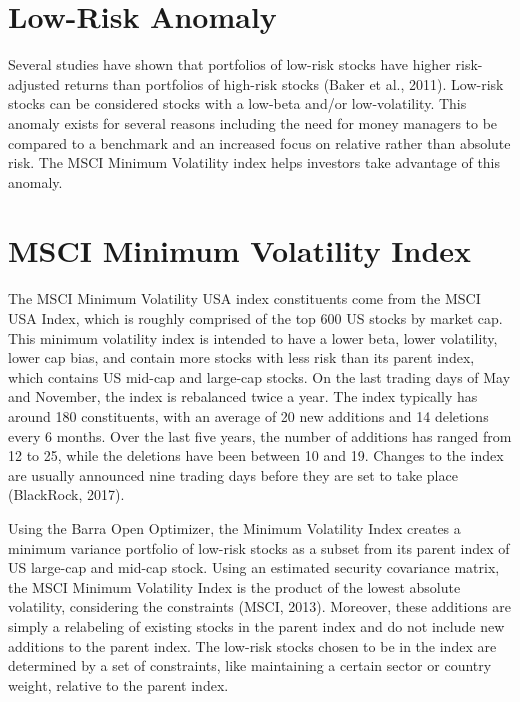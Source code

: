 \documentclass[12pt,twoside]{reedthesis}
\theoremstyle{definition}
\theoremstyle{definition}
\theoremstyle{definition}
\theoremstyle{remark}
\begin{document}
\section{Low-Risk Anomaly}\label{low-risk-anomaly}

Several studies have shown that portfolios of low-risk stocks have
higher risk-adjusted returns than portfolios of high-risk stocks (Baker
et al., 2011). Low-risk stocks can be considered stocks with a low-beta
and/or low-volatility. This anomaly exists for several reasons including
the need for money managers to be compared to a benchmark and an
increased focus on relative rather than absolute risk. The MSCI Minimum
Volatility index helps investors take advantage of this anomaly.

\section{MSCI Minimum Volatility
Index}\label{msci-minimum-volatility-index}

The MSCI Minimum Volatility USA index constituents come from the MSCI
USA Index, which is roughly comprised of the top 600 US stocks by market
cap. This minimum volatility index is intended to have a lower beta,
lower volatility, lower cap bias, and contain more stocks with less risk
than its parent index, which contains US mid-cap and large-cap stocks.
On the last trading days of May and November, the index is rebalanced
twice a year. The index typically has around 180 constituents, with an
average of 20 new additions and 14 deletions every 6 months. Over the
last five years, the number of additions has ranged from 12 to 25, while
the deletions have been between 10 and 19. Changes to the index are
usually announced nine trading days before they are set to take place
(BlackRock, 2017).

Using the Barra Open Optimizer, the Minimum Volatility Index creates a
minimum variance portfolio of low-risk stocks as a subset from its
parent index of US large-cap and mid-cap stock. Using an estimated
security covariance matrix, the MSCI Minimum Volatility Index is the
product of the lowest absolute volatility, considering the constraints
(MSCI, 2013). Moreover, these additions are simply a relabeling of
existing stocks in the parent index and do not include new additions to
the parent index. The low-risk stocks chosen to be in the index are
determined by a set of constraints, like maintaining a certain sector or
country weight, relative to the parent index.
\end{document}
